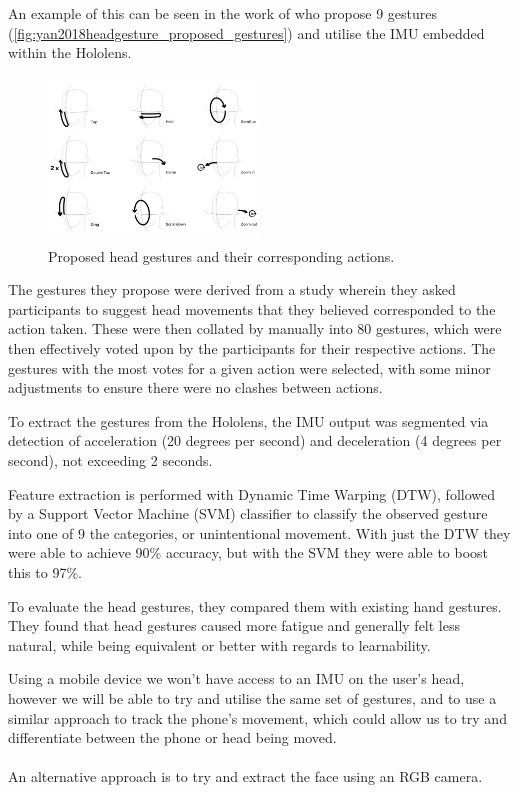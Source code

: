 An example of this can be seen in the work of \citeauthor{yan2018headgesture} who propose 9 gestures (\autoref{fig:yan2018headgesture_proposed_gestures}) and utilise the IMU embedded within the Hololens\cite{yan2018headgesture}.
\begin{figure}
    \centering
    \includegraphics[width=0.5\textwidth]{figures/yan2018headgesture_fig2_proposed_gestures.png}
    \caption{\label{fig:yan2018headgesture_proposed_gestures} Proposed head gestures and their corresponding actions\cite{yan2018headgesture}.}
\end{figure}

The gestures they propose were derived from a study wherein they asked participants to suggest head movements that they believed corresponded to the action taken.
These were then collated by manually into 80 gestures, which were then effectively voted upon by the participants for their respective actions.
The gestures with the most votes for a given action were selected, with some minor adjustments to ensure there were no clashes between actions.

To extract the gestures from the Hololens, the IMU output was segmented via detection of acceleration (20 degrees per second) and deceleration (4 degrees per second), not exceeding 2 seconds.

Feature extraction is performed with Dynamic Time Warping (DTW)\cite{berndt1994using}, followed by a Support Vector Machine (SVM) classifier to classify the observed gesture into one of 9 the categories, or unintentional movement. With just the DTW they were able to achieve 90\% accuracy, but with the SVM they were able to boost this to 97\%.

To evaluate the head gestures, they compared them with existing hand gestures. They found that head gestures caused more fatigue and generally felt less natural, while being equivalent or better with regards to learnability.

Using a mobile device we won't have access to an IMU on the user's head, however we will be able to try and utilise the same set of gestures, and to use a similar approach to track the phone's movement, which could allow us to try and differentiate between the phone or head being moved.
\\\\
An alternative approach is to try and extract the face using an RGB camera.

